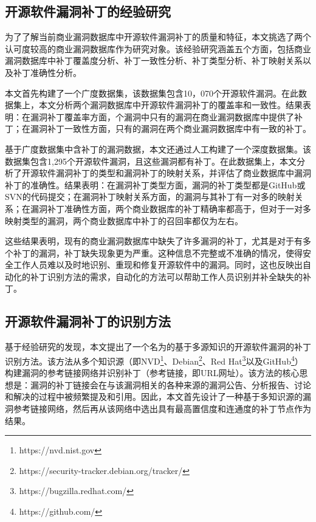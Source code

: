 \subsection{开源软件漏洞补丁的经验研究}
为了了解当前商业漏洞数据库中开源软件漏洞补丁的质量和特征，本文挑选了两个认可度较高的商业漏洞数据库作为研究对象。该经验研究涵盖五个方面，包括商业漏洞数据库中补丁覆盖度分析、补丁一致性分析、补丁类型分析、补丁映射关系以及补丁准确性分析。

本文首先构建了一个广度数据集，该数据集包含10，070个开源软件漏洞。在此数据集上，本文分析两个漏洞数据库中开源软件漏洞补丁的覆盖率和一致性。结果表明：在漏洞补丁覆盖率方面，个漏洞中只有的漏洞在商业漏洞数据库中提供了补丁；在漏洞补丁一致性方面，只有的漏洞在两个商业漏洞数据库中有一致的补丁。%

基于广度数据集中含补丁的漏洞数据，本文还通过人工构建了一个深度数据集。该数据集包含1,295个开源软件漏洞，且这些漏洞都有补丁。在此数据集上，本文分析了开源软件漏洞补丁的类型和漏洞补丁的映射关系，并评估了商业数据库中漏洞补丁的准确性。结果表明：在漏洞补丁类型方面，漏洞的补丁类型都是GitHub或SVN的代码提交；在漏洞补丁映射关系方面，的漏洞与其补丁有一对多的映射关系；在漏洞补丁准确性方面，两个商业数据库的补丁精确率都高于，但对于一对多映射类型的漏洞，两个商业数据库中补丁的召回率都仅为左右。

这些结果表明，现有的商业漏洞数据库中缺失了许多漏洞的补丁，尤其是对于有多个补丁的漏洞，补丁缺失现象更为严重。这种信息不完整或不准确的情况，使得安全工作人员难以及时地识别、重现和修复开源软件中的漏洞。同时，这也反映出自动化的补丁识别方法的需求，自动化的方法可以帮助工作人员识别并补全缺失的补丁。

\subsection{开源软件漏洞补丁的识别方法}
基于经验研究的发现，本文提出了一个名为\tool 的基于多源知识的开源软件漏洞的补丁识别方法。该方法从多个知识源（即NVD\footnote{https://nvd.nist.gov}、Debian\footnote{https://security-tracker.debian.org/tracker/}、Red Hat\footnote{https://bugzilla.redhat.com/}以及GitHub\footnote{https://github.com/}）构建漏洞的参考链接网络并识别补丁（参考链接，即URL网址）。该方法的核心思想是：漏洞的补丁链接会在与该漏洞相关的各种来源的漏洞公告、分析报告、讨论和解决的过程中被频繁提及和引用。因此，本文首先设计了一种基于多知识源的漏洞参考链接网络，然后再从该网络中选出具有最高置信度和连通度的补丁节点作为结果。


